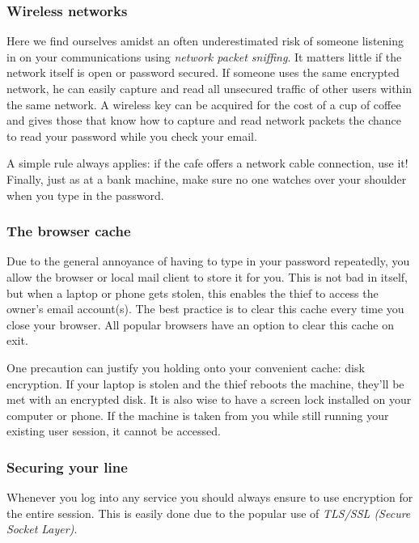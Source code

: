 \subsubsection{Wireless networks}

Here we find ourselves amidst an often underestimated risk of someone
listening in on your communications using \emph{network packet
sniffing}. It matters little if the network itself is open or password
secured. If someone uses the same encrypted network, he can easily
capture and read all unsecured traffic of other users within the same
network. A wireless key can be acquired for the cost of a cup of coffee
and gives those that know how to capture and read network packets the
chance to read your password while you check your email.

A simple rule always applies: if the cafe offers a network cable
connection, use it! Finally, just as at a bank machine, make sure no one
watches over your shoulder when you type in the password.

\subsubsection{The browser cache}

Due to the general annoyance of having to type in your password
repeatedly, you allow the browser or local mail client to store it for
you. This is not bad in itself, but when a laptop or phone gets stolen,
this enables the thief to access the owner's email account(s). The best
practice is to clear this cache every time you close your browser. All
popular browsers have an option to clear this cache on exit.

One precaution can justify you holding onto your convenient cache: disk
encryption. If your laptop is stolen and the thief reboots the machine,
they'll be met with an encrypted disk. It is also wise to have a screen
lock installed on your computer or phone. If the machine is taken from
you while still running your existing user session, it cannot be
accessed.

\subsubsection{Securing your line}

Whenever you log into any service you should always ensure to use
encryption for the entire session. This is easily done due to the
popular use of \emph{TLS/SSL (Secure Socket Layer)}.


